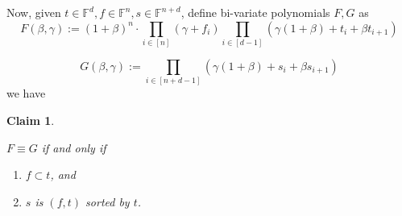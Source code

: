 \documentclass[11pt]{article} %
\newcommand{\F}{\ensuremath{\mathbb F}\xspace}
\newcommand{\defeq}{:=}
\newtheorem{claim}[lemma]{Claim}
\begin{document}
Now, given $t\in \F^d, f\in \F^n, s\in \F^{n+d}$, define bi-variate polynomials $F,G$ as 
\[F(\beta,\gamma) \defeq (1+\beta)^n\cdot \prod_{i\in [n]} (\gamma + f_i) \prod_{i\in [d-1]} (\gamma(1+\beta) + t_i + \beta t_{i+1})\]
                                  
\[G(\beta,\gamma) \defeq \prod_{i\in [n+d-1]} \left( \gamma(1+\beta) + s_i + \beta s_{i+1} \right)\]
we have
\begin{claim}\label{clm:main_lookup}

 $F\equiv G$ if and only if 
 \begin{enumerate}
  \item $f \subset t$, and 
  \item $s$ is $(f,t)$ sorted by $t$. 
 \end{enumerate}

\end{claim}
\end{document}
